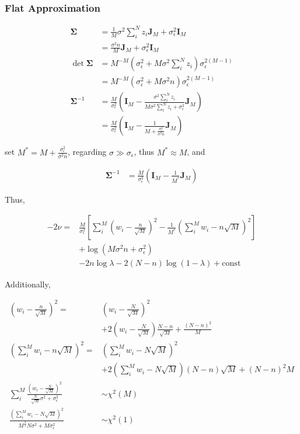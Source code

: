 \documentclass[notitlepage]{article}
\begin{document}
\subsubsection{Flat Approximation}

\begin{align}
    \bm{\Sigma} &= \frac{1}{M}\sigma^2\sum_i^N z_i\bm{J}_M + \sigma_\epsilon^2\bm{I}_M \\
    &= \frac{\sigma^2n}{M}\bm{J}_M+\sigma_\epsilon^2\bm{I}_M \\
    \det\bm{\Sigma} &= M^{-M}(\sigma_\epsilon^2 + M\sigma^2\sum_i^N z_i)\sigma_\epsilon^{2(M-1)} \\
    &= M^{-M}(\sigma_\epsilon^2+M\sigma^2n)\sigma_\epsilon^{2(M-1)} \\
    \bm{\Sigma}^{-1} &= \frac{M}{\sigma_\epsilon^2}(\bm{I}_M - \frac{\sigma^2\sum_i^N z_i}{M\sigma^2\sum_i^N z_i+\sigma_\epsilon^2}\bm{J}_M) \\
    &= \frac{M}{\sigma_\epsilon^2}(\bm{I}_M - \frac{1}{M+\frac{\sigma_\epsilon^2}{\sigma^2n}}\bm{J}_M)
\end{align}

set $M^\ast = M+\frac{\sigma_\epsilon^2}{\sigma^2n}$, regarding $\sigma\gg\sigma_\epsilon$, thus $M^\ast\approx M$, and

\begin{align}
    \bm{\Sigma}^{-1} &= \frac{M}{\sigma_\epsilon^2}(\bm{I}_M - \frac{1}{M^\ast}\bm{J}_M)
\end{align}

Thus, 

\begin{align}
    -2\nu =& \frac{M}{\sigma_\epsilon^2}[\sum_i^M(w_i-\frac{n}{\sqrt{M}})^2-\frac{1}{M^\ast}(\sum_i^M w_i-n\sqrt{M})^2] \\
    &+ \log(M\sigma^2n+\sigma_\epsilon^2) \\
    &- 2n\log\lambda - 2(N-n)\log(1-\lambda) + \mathrm{const}
\end{align}

Additionally, 

\begin{align}
    (w_i-\frac{n}{\sqrt{M}})^2 =& (w_i - \frac{N}{\sqrt{M}})^2 \\ 
    &+ 2(w_i - \frac{N}{\sqrt{M}})\frac{N-n}{\sqrt{M}} + \frac{(N-n)^2}{M} \\
    (\sum_i^M w_i-n\sqrt{M})^2 =& (\sum_i^M w_i-N\sqrt{M})^2 \\
    &+ 2(\sum_i^M w_i-N\sqrt{M})(N-n)\sqrt{M} + (N-n)^2M \\
    \sum_i^M\frac{(w_i - \frac{N}{\sqrt{M}})^2}{\frac{N}{\sqrt{M}}\sigma^2+\sigma_\epsilon^2} &\sim \chi^2(M) \\
    \frac{(\sum_i^M w_i-N\sqrt{M})^2}{M^{\frac{3}{2}}N\sigma^2+M\sigma_\epsilon^2} &\sim \chi^2(1)
\end{align}
\end{document}
